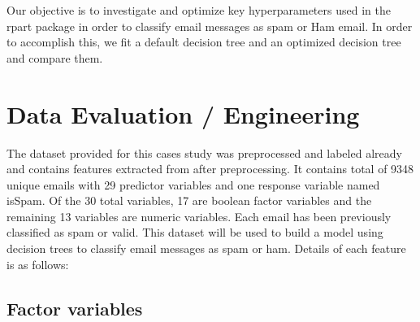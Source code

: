 \documentclass[
]{article}
\begin{document}
Our objective is to investigate and optimize key hyperparameters used in
the rpart package in order to classify email messages as spam or Ham
email. In order to accomplish this, we fit a default decision tree and
an optimized decision tree and compare them.

\newpage

\hypertarget{data-evaluation-engineering}{%
\section{Data Evaluation /
Engineering}\label{data-evaluation-engineering}}

The dataset provided for this cases study was preprocessed and labeled
already and contains features extracted from after preprocessing. It
contains total of 9348 unique emails with 29 predictor variables and one
response variable named isSpam. Of the 30 total variables, 17 are
boolean factor variables and the remaining 13 variables are numeric
variables. Each email has been previously classified as spam or valid.
This dataset will be used to build a model using decision trees to
classify email messages as spam or ham. Details of each feature is as
follows:

\hypertarget{factor-variables}{%
\subsection{Factor variables}\label{factor-variables}}
\end{document}
